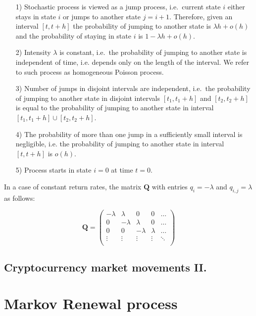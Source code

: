 \begin{itemize}
\item [1)] Stochastic process is viewed as a jump process, i.e.\ current state $i$ either stays in state $i$ or jumps to another state $j=i+1$. Therefore, given an interval $[t,t+h]$ the probability of jumping to another state is $\lambda h + o(h)$ and the probability of staying in state $i$ is $1-\lambda h + o(h)$.
\item [2)] Intensity $\lambda$ is constant, i.e.\ the probability of jumping to another state is independent of time, i.e. depends only on the length of the interval. We refer to such process as homogeneous Poisson process.
\item [3)] Number of jumps in disjoint intervals are independent, i.e.\ the probability of jumping to another state in disjoint intervals $[t_1,t_1+h]$ and $[t_2,t_2+h]$ is equal to the probability of jumping to another state in interval $[t_1,t_1+h] \cup [t_2,t_2+h]$.
\item [4)] The probability of more than one jump in a sufficiently small interval is negligible, i.e. the probability of jumping to another state in interval $[t,t+h]$ is $o(h)$.
\item [5)] Process starts in state $i=0$ at time $t=0$.
\end{itemize}

In a case of constant return rates, the matrix $\textbf{Q}$ with entries $q_{i} = - \lambda$ and $q_{i,j} = \lambda$ as follows:

\begin{equation}
    \textbf{Q} = 
    \begin{pmatrix}
    -\lambda & \lambda & 0 & 0 & \ldots \\
    0 & -\lambda & \lambda & 0 & \ldots \\
    0 & 0 & -\lambda & \lambda & \ldots \\
    \vdots & \vdots & \vdots & \vdots & \ddots \\
    \end{pmatrix}
\end{equation}

\subsection{Cryptocurrency market movements II.}


\section{Markov Renewal process}

